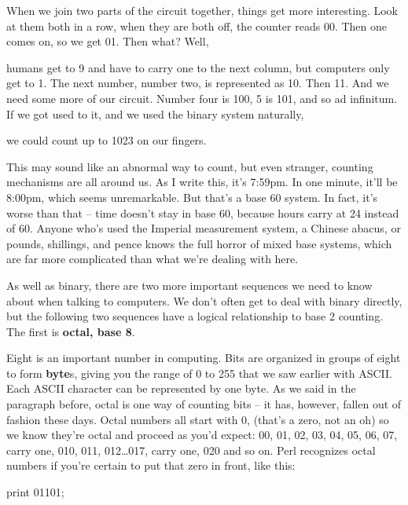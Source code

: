 \documentclass[a4paper,11pt]{book}
\begin{document}
\noindent 

\noindent When we join two parts of the circuit together, things get more interesting. Look at them both in a row, when they are both off, the counter reads 00. Then one comes on, so we get 01. Then what? Well,

\noindent humans get to 9 and have to carry one to the next column, but computers only get to 1. The next number, number two, is represented as 10. Then 11. And we need some more of our circuit. Number four is 100, 5 is 101, and so ad infinitum. If we got used to it, and we used the binary system naturally,

\noindent we could count up to 1023 on our fingers.

\noindent 

\noindent This may sound like an abnormal way to count, but even stranger, counting mechanisms are all around us. As I write this, it's 7:59pm. In one minute, it'll be 8:00pm, which seems unremarkable. But that's a base 60 system. In fact, it's worse than that -- time doesn't stay in base 60, because hours carry at 24 instead of 60. Anyone who's used the Imperial measurement system, a Chinese abacus, or pounds, shillings, and pence knows the full horror of mixed base systems, which are far more complicated than what we're dealing with here.

\noindent 

\noindent As well as binary, there are two more important sequences we need to know about when talking to computers. We don't often get to deal with binary directly, but the following two sequences have a logical relationship to base 2 counting. The first is \textbf{octal, base 8}.

\noindent 

\noindent Eight is an important number in computing. Bits are organized in groups of eight to form \textbf{byte}s, giving you the range of 0 to 255 that we saw earlier with ASCII. Each ASCII character can be represented by one byte. As we said in the paragraph before, octal is one way of counting bits -- it has, however, fallen out of fashion these days. Octal numbers all start with 0, (that's a zero, not an oh) so we know they're octal and proceed as you'd expect: 00, 01, 02, 03, 04, 05, 06, 07, carry one, 010, 011, 012\dots 017, carry one, 020 and so on. Perl recognizes octal numbers if you're certain to put that zero in front, like this:

\noindent 

\noindent print 01101;
\end{document}
